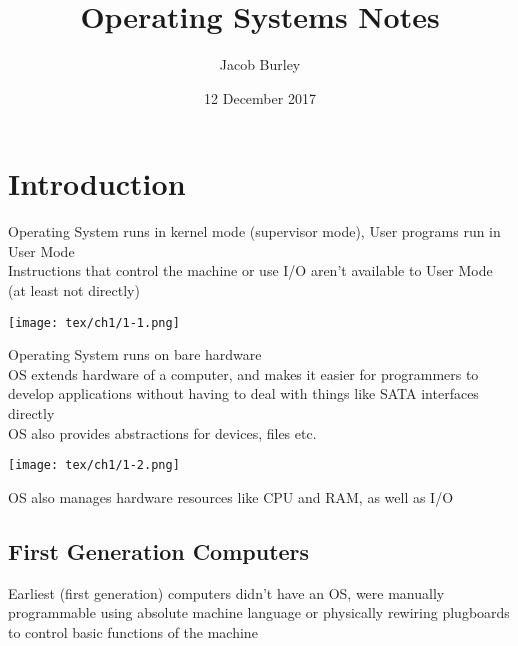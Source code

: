 \documentclass{article}
\title{Operating Systems Notes}
\author{Jacob Burley} %
\date{12 December 2017}
\begin{document}
\maketitle
\section{Introduction}
Operating System runs in kernel mode (supervisor mode), User programs run in User Mode
\\Instructions that control the machine or use I/O aren't available to User Mode (at least not directly)
\begin{center}
\texttt{[image: tex/ch1/1-1.png]}
\end{center}
Operating System runs on bare hardware
\\OS extends hardware of a computer, and makes it easier for programmers to develop applications without having to deal with things like SATA interfaces directly
\\OS also provides abstractions for devices, files etc.
\begin{center}
\texttt{[image: tex/ch1/1-2.png]}
\end{center}
OS also manages hardware resources like CPU and RAM, as well as I/O
\subsection*{First Generation Computers}
Earliest (first generation) computers didn't have an OS, were manually programmable using absolute machine language or physically rewiring plugboards to control basic functions of the machine
\end{document}
